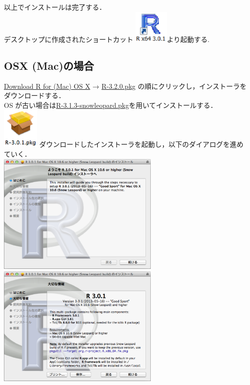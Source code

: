 \documentclass[a4paper,10pt,fleqn]{jarticle}
\begin{document}
以上でインストールは完了する．\\

デスクトップに作成されたショートカット \includegraphics[width=1.7cm]{img/windows/win012.eps}より起動する.
\subsection{OSX (Mac)の場合}
\underline{Download R for (Mac) OS X} → \underline{R-3.2.0.pkg} の順にクリックし，インストーラをダウンロードする．\\
OS が古い場合は\underline{R-3.1.3-snowleopard.pkg}を用いてインストールする．
\includegraphics[width=1.8cm]{img/osx/osx001.eps} ダウンロードしたインストーラを起動し，以下のダイアログを進めていく．\\

\includegraphics[width=8cm]{img/osx/osx002.eps}\hspace{0.8em} \includegraphics[width=8cm]{img/osx/osx003.eps} \\
\end{document}
